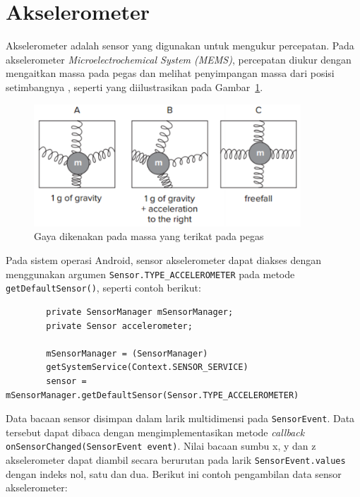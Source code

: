 \section{Akselerometer}
Akselerometer adalah sensor yang digunakan untuk mengukur percepatan. Pada akselerometer \textit{Microelectrochemical System (MEMS)}, percepatan diukur dengan mengaitkan massa pada pegas dan melihat penyimpangan massa dari posisi setimbangnya \citep{milette-2012}, seperti yang diilustrasikan pada Gambar~\ref{gambar:akselerometer-mems}.

\begin{figure}[h!]
    \centering
    \includegraphics[width=10cm]{gambar/landasan-teori/akselerometer-mems.png}
    \caption{Gaya dikenakan pada massa yang terikat pada pegas \citep{milette-2012}}
    \label{gambar:akselerometer-mems}
\end{figure}

Pada sistem operasi Android, sensor akselerometer dapat diakses dengan menggunakan argumen \texttt{Sensor.TYPE_ACCELEROMETER} pada metode \texttt{getDefaultSensor()}, seperti contoh berikut:

\begin{listing}[h]
    \begin{verbatim}
        private SensorManager mSensorManager;
        private Sensor accelerometer;

        mSensorManager = (SensorManager)
        getSystemService(Context.SENSOR_SERVICE)
        sensor = mSensorManager.getDefaultSensor(Sensor.TYPE_ACCELEROMETER)
    \end{verbatim}
\end{listing}

Data bacaan sensor disimpan dalam larik multidimensi pada \texttt{SensorEvent}. Data tersebut dapat dibaca dengan mengimplementasikan metode \textit{callback} \linebreak \texttt{onSensorChanged(SensorEvent event)}. Nilai bacaan sumbu x, y dan z akselerometer dapat diambil secara berurutan pada larik \texttt{SensorEvent.values} dengan indeks nol, satu dan dua. Berikut ini contoh pengambilan data sensor akselerometer:

